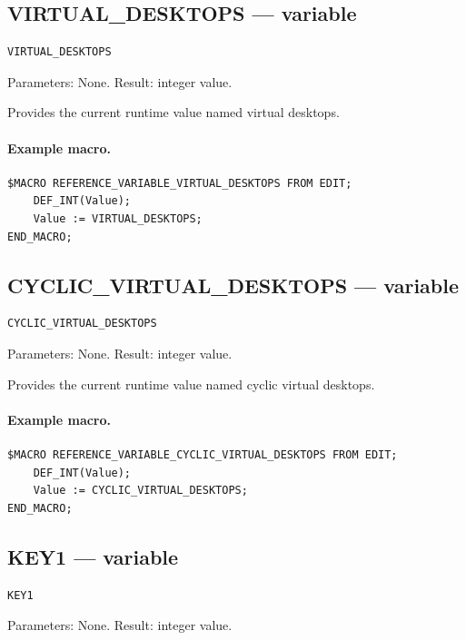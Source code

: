 \documentclass[a4paper,10pt,twoside,openany]{book}
\begin{document}
\label{prim:variable-virtual-desktops}
\subsection*{VIRTUAL\_DESKTOPS --- variable}
\begin{verbatim}
VIRTUAL_DESKTOPS
\end{verbatim}
Parameters: None. Result: integer value.

Provides the current runtime value named virtual desktops.

\paragraph{Example macro.}
\begin{verbatim}
$MACRO REFERENCE_VARIABLE_VIRTUAL_DESKTOPS FROM EDIT;
    DEF_INT(Value);
    Value := VIRTUAL_DESKTOPS;
END_MACRO;
\end{verbatim}

\label{prim:variable-cyclic-virtual-desktops}
\subsection*{CYCLIC\_VIRTUAL\_DESKTOPS --- variable}
\begin{verbatim}
CYCLIC_VIRTUAL_DESKTOPS
\end{verbatim}
Parameters: None. Result: integer value.

Provides the current runtime value named cyclic virtual desktops.

\paragraph{Example macro.}
\begin{verbatim}
$MACRO REFERENCE_VARIABLE_CYCLIC_VIRTUAL_DESKTOPS FROM EDIT;
    DEF_INT(Value);
    Value := CYCLIC_VIRTUAL_DESKTOPS;
END_MACRO;
\end{verbatim}

\label{prim:variable-key1}
\subsection*{KEY1 --- variable}
\begin{verbatim}
KEY1
\end{verbatim}
Parameters: None. Result: integer value.
\end{document}
